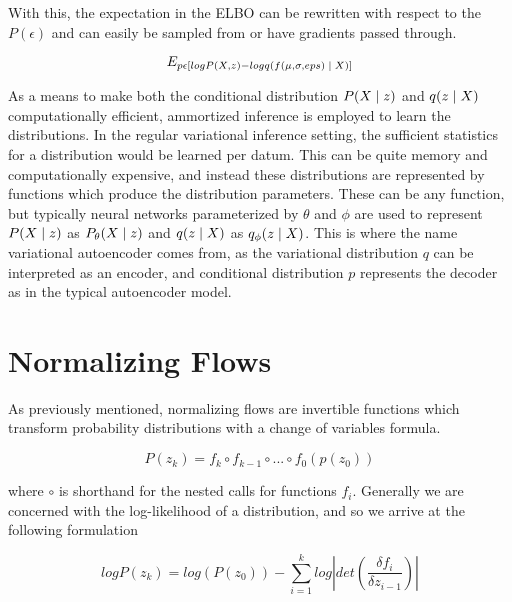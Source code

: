 With this, the expectation in the \ac{ELBO} can be rewritten with respect to the $P(\epsilon)$ and can easily be sampled from or have gradients passed through.

\begin{equation}
	E_{p{\epsilon} [ log P(X, z) - log q( f(\mu, \sigma, eps) \; | \;{X})]}
\end{equation}

As a means to make both the conditional distribution $P(X \; | \;{z})$ and $q(z \; | \;{X})$ computationally efficient, ammortized inference  is employed to learn the distributions. In the regular variational inference setting, the sufficient statistics for a distribution would be learned per datum. This can be quite memory and computationally expensive, and instead these distributions are represented by functions which produce the distribution parameters. These can be any function, but typically neural networks parameterized by $\theta$ and $\phi$ are used to represent $P(X \; | \;{z})$ as $P_{\theta}(X \; | \;{z})$ and $q(z \; | \;{X})$ as $q_{\phi}(z \; | \;{X})$. This is where the name variational autoencoder comes from, as the variational distribution $q$ can be interpreted as an encoder, and conditional distribution $p$ represents the decoder as in the typical autoencoder model. 

\section{Normalizing Flows}

As previously mentioned, normalizing flows are invertible functions which transform probability distributions with a change of variables formula.

\begin{equation}
	P(z_{k}) = f_{k} \circ f_{k-1} \circ ... \circ f_{0}(p(z_{0}))
\end{equation} 

where $\circ$ is shorthand for the nested calls for functions $f_{i}$. Generally we are concerned with the log-likelihood of a distribution, and so we arrive at the following formulation



\begin{equation}
	logP(z_{k}) = log(P(z_{0})) - \sum_{i=1}^{k} log |det (\frac{\delta f_{i}}{\delta z_{i-1}}) |
\end{equation}

